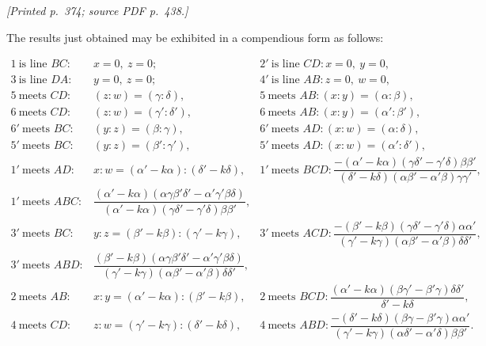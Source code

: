 \documentclass[11pt,a4paper]{article}
\newcommand{\sourcepage}[2]{\par\smallskip\noindent\textit{[Printed p.~#1; source PDF p.~#2.]}\par\smallskip}
\begin{document}
\sourcepage{374}{438}
The results just obtained may be exhibited in a compendious form as follows:
\begin{center}
\scriptsize
$
\begin{array}{lll}
1\ \text{is line }BC: & x=0,\ z=0;&
2'\ \text{is line }CD: x=0,\ y=0,\\
3\ \text{is line }DA: & y=0,\ z=0;&
4'\ \text{is line }AB: z=0,\ w=0,\\[1mm]
5\ \text{meets }CD:& (z:w)=(\gamma:\delta),&
5\ \text{meets }AB:(x:y)=(\alpha:\beta),\\
6\ \text{meets }CD:& (z:w)=(\gamma':\delta'),&
6\ \text{meets }AB:(x:y)=(\alpha':\beta'),\\
6'\ \text{meets }BC:& (y:z)=(\beta:\gamma),&
6'\ \text{meets }AD:(x:w)=(\alpha:\delta),\\
5'\ \text{meets }BC:& (y:z)=(\beta':\gamma'),&
5'\ \text{meets }AD:(x:w)=(\alpha':\delta'),\\[1mm]
1'\ \text{meets }AD:& x:w=(\alpha'-k\alpha):(\delta'-k\delta),&
1'\ \text{meets }BCD:
\dfrac{-(\alpha'-k\alpha)(\gamma\delta'-\gamma'\delta)\beta\beta'}
{(\delta'-k\delta)(\alpha\beta'-\alpha'\beta)\gamma\gamma'},\\
1'\ \text{meets }ABC:&
\dfrac{(\alpha'-k\alpha)(\alpha\gamma\beta'\delta'-\alpha'\gamma'\beta\delta)}
{(\alpha'-k\alpha)(\gamma\delta'-\gamma'\delta)\beta\beta'},&\\
3'\ \text{meets }BC:& y:z=(\beta'-k\beta):(\gamma'-k\gamma),&
3'\ \text{meets }ACD:
\dfrac{-(\beta'-k\beta)(\gamma\delta'-\gamma'\delta)\alpha\alpha'}
{(\gamma'-k\gamma)(\alpha\beta'-\alpha'\beta)\delta\delta'},\\
3'\ \text{meets }ABD:&
\dfrac{(\beta'-k\beta)(\alpha\gamma\beta'\delta'-\alpha'\gamma'\beta\delta)}
{(\gamma'-k\gamma)(\alpha\beta'-\alpha'\beta)\delta\delta'},&\\
2\ \text{meets }AB:& x:y=(\alpha'-k\alpha):(\beta'-k\beta),&
2\ \text{meets }BCD:
\dfrac{(\alpha'-k\alpha)(\beta\gamma'-\beta'\gamma)\delta\delta'}
{\delta'-k\delta},\\
4\ \text{meets }CD:& z:w=(\gamma'-k\gamma):(\delta'-k\delta),&
4\ \text{meets }ABD:
\dfrac{-(\delta'-k\delta)(\beta\gamma-\beta'\gamma)\alpha\alpha'}
{(\gamma'-k\gamma)(\alpha\delta'-\alpha'\delta)\beta\beta'}.
\end{array}
$
\end{center}
\end{document}
